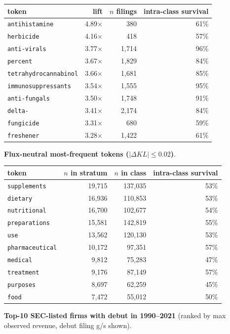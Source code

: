 \begin{tabular}{lrrr}
\toprule
token & lift & $n$ filings & intra-class survival \\
\midrule
\texttt{antihistamine} & 4.89$\times$ & 380 & 61\% \\
\texttt{herbicide} & 4.16$\times$ & 418 & 57\% \\
\texttt{anti-virals} & 3.77$\times$ & 1,714 & 96\% \\
\texttt{percent} & 3.67$\times$ & 1,829 & 84\% \\
\texttt{tetrahydrocannabinol} & 3.66$\times$ & 1,681 & 85\% \\
\texttt{immunosuppressants} & 3.54$\times$ & 1,555 & 95\% \\
\texttt{anti-fungals} & 3.50$\times$ & 1,748 & 91\% \\
\texttt{delta-} & 3.41$\times$ & 2,174 & 84\% \\
\texttt{fungicide} & 3.31$\times$ & 680 & 59\% \\
\texttt{freshener} & 3.28$\times$ & 1,422 & 61\% \\
\bottomrule
\end{tabular}

\textbf{Flux-neutral most-frequent tokens ($|\Delta KL|\leq 0.02$)}.

\begin{tabular}{lrrr}
\toprule
token & $n$ in stratum & $n$ in class & intra-class survival \\
\midrule
\texttt{supplements} & 19,715 & 137,035 & 53\% \\
\texttt{dietary} & 16,936 & 110,853 & 53\% \\
\texttt{nutritional} & 16,700 & 102,677 & 54\% \\
\texttt{preparations} & 15,581 & 142,819 & 55\% \\
\texttt{use} & 13,562 & 120,130 & 53\% \\
\texttt{pharmaceutical} & 10,172 & 97,351 & 57\% \\
\texttt{medical} & 9,812 & 75,283 & 47\% \\
\texttt{treatment} & 9,176 & 87,149 & 57\% \\
\texttt{purposes} & 8,697 & 62,259 & 45\% \\
\texttt{food} & 7,472 & 55,012 & 50\% \\
\bottomrule
\end{tabular}

\textbf{Top-10 SEC-listed firms with debut in 1990--2021} (ranked by max observed revenue, debut filing g/s shown).

